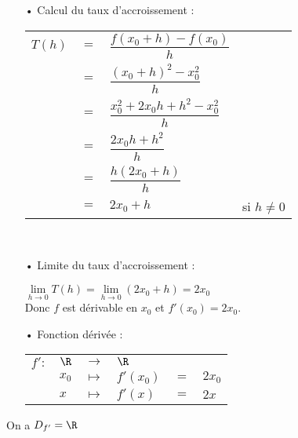 \begin{itemize}
\item[•] Calcul du taux d'accroissement : \vspace*{.3cm}
\\
\begin{tabular}{llll}
$T(h)$ & $=$ & $\dfrac{f(x_0 + h) - f(x_0)}{h}$ & \vspace*{.3cm} \\
& $=$ & $\dfrac{\left(x_0 + h\right)^2 - x_0^2}{h}$ & \vspace*{.3cm} \\
& $=$ & $\dfrac{x_0^2 + 2x_0h + h^2 - x_0^2}{h}$ & \vspace*{.3cm} \\
& $=$ & $\dfrac{2x_0h + h^2}{h}$ & \vspace*{.3cm} \\
& $=$ & $\dfrac{h\left(2x_0 + h\right)}{h}$ & \vspace*{.3cm} \\
& $=$ & $2x_0 + h$ & si $h \neq 0$ \\
\end{tabular} \\
\vspace*{.3cm}

\item[•] Limite du taux d'accroissement : \vspace*{.3cm}

$\lim\limits_{h \to 0} T(h) = \lim\limits_{h \to 0} (2x_0 + h) = 2x_0$ \vspace*{.3cm} \\

Donc $f$ est dérivable en $x_0$ et $f'(x_0) = 2x_0$. \\

\item[•] Fonction dérivée : \\

\begin{tabular}{llllll}
$f' :$ & $\R$ & $\longrightarrow$ & $\R$ & & \\
& $x_0$ & $\longmapsto$ & $f'(x_0)$ & $ = $ & $2x_0$ \\
& $x$ & $\longmapsto$ & $f'(x)$ & $ = $ & $2x$ \\
\end{tabular}
\end{itemize}

\vspace*{.3cm}

On a $D_{f'} = \R$ \\

